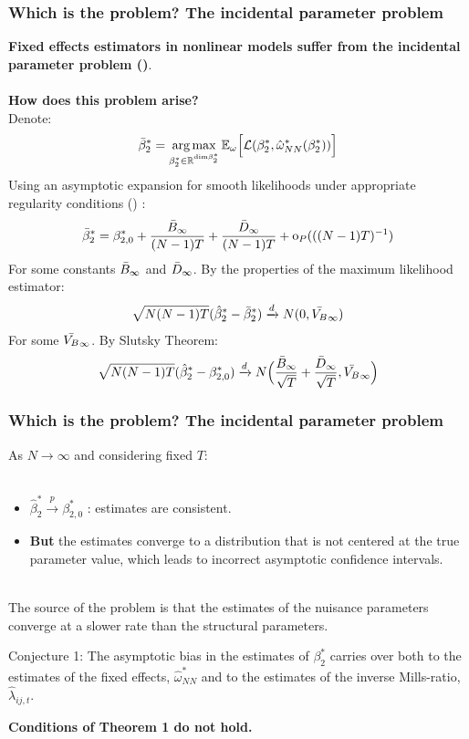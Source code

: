 \begin{frame}
    \frametitle{Which is the problem? The incidental parameter problem}
    \textbf{Fixed effects estimators in nonlinear models suffer from the \textbf{incidental parameter problem} (\cite{neyman1948consistent})}. \pause
    \\~\\
    \textbf{How does this problem arise?}\\
    Denote:
    $$\Bar{\beta}^*_2 = \operatorname*{arg\max}_{\beta^*_2 \in \mathbb{R}^{\text{dim} \beta^*_2}} \mathbb{E}_\omega \Big[\mathcal{L} (\beta^*_2, \hat{\omega}_{NN}^*(\beta^*_2)) \Big]$$
    Using an asymptotic expansion for smooth likelihoods under appropriate regularity conditions (\cite{fernandez2016individual}) \hyperlink{Asymptotic}{}
    :
    \begin{align*} 
        \Bar{\beta}_2^* = \beta_{2,0}^* + \frac{\Bar{B}_\infty}{(N-1)T} + \frac{\Bar{D}_\infty}{(N-1)T} + \text{o}_P(((N-1)T)^{-1})
    \end{align*}
    For some constants $\Bar{B}_\infty$ and $\Bar{D}_\infty$. \pause
    By the properties of the maximum likelihood estimator:
    \begin{align*}
        \sqrt{N(N-1)T} (\hat{\beta}_2^* - \Bar{\beta}_2^*) \xrightarrow{d} N(0, \Bar{V_B}_\infty)
    \end{align*}
    For some $\Bar{V_B}_\infty$. By Slutsky Theorem:
    \begin{align*} 
        \sqrt{N(N-1)T} (\hat{\beta}_2^* - \beta_{2,0}^*) \xrightarrow{d} N\Big( \frac{\Bar{B}_\infty}{\sqrt{T}} + \frac{\Bar{D}_\infty}{\sqrt{T}}, \Bar{V_B}_\infty\Big) \nonumber
    \end{align*}
\end{frame}


\begin{frame}
    \frametitle{Which is the problem? The incidental parameter problem}
    As $N \xrightarrow{} \infty$ and considering fixed $T$:
    \\~\\
    \begin{itemize}
        \item $\hat{\beta}_2^* \xrightarrow{p} \beta_{2,0}^*$ : estimates are consistent.
        \item \textbf{But} the estimates converge to a distribution that is not centered at the true parameter value, which leads to incorrect asymptotic confidence intervals.
        \\~\\
    \end{itemize} \pause
    The source of the problem is that the estimates of the nuisance parameters converge at a slower rate than the structural parameters. \pause
    \begin{block}{Conjecture 1:}
        The asymptotic bias in the estimates of $\beta_{2}^*$ carries over both to the estimates of the fixed effects, $\hat{\omega}_{NN}^*$ and to the estimates of the inverse Mills-ratio, $\hat{\lambda}_{ij,t}$.
    \end{block}
    \textbf{Conditions of Theorem 1 do not hold.}
\end{frame}

